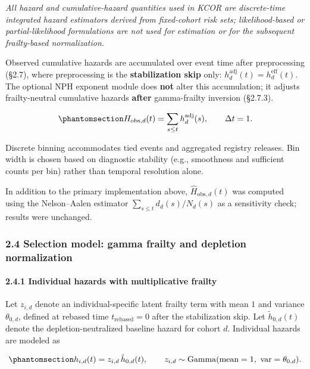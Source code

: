 \documentclass[
]{article}
\begin{document}
\emph{All hazard and cumulative-hazard quantities used in KCOR are discrete-time integrated hazard estimators derived from fixed-cohort risk sets; likelihood-based or partial-likelihood formulations are not used for estimation or for the subsequent frailty-based normalization.}

Observed cumulative hazards are accumulated over event time after preprocessing (§2.7), where preprocessing is the \textbf{stabilization skip} only: \(h_d^{\mathrm{adj}}(t)=h_d^{\mathrm{eff}}(t)\). The optional NPH exponent module does \textbf{not} alter this accumulation; it adjusts frailty-neutral cumulative hazards \textbf{after} gamma-frailty inversion (§2.7.3).

\begin{equation}\protect\phantomsection\label{eq:cumhazard-observed}{H_{\mathrm{obs},d}(t) = \sum_{s \le t} h_d^{\mathrm{adj}}(s),
\qquad \Delta t = 1.}\end{equation}

Discrete binning accommodates tied events and aggregated registry releases. Bin width is chosen based on diagnostic stability (e.g., smoothness and sufficient counts per bin) rather than temporal resolution alone.

In addition to the primary implementation above, \(\hat H_{\mathrm{obs},d}(t)\) was computed using the Nelson--Aalen estimator \(\sum_{s \le t} d_d(s)/N_d(s)\) as a sensitivity check; results were unchanged.

\subsubsection{2.4 Selection model: gamma frailty and depletion normalization}\label{selection-model-gamma-frailty-and-depletion-normalization}

\paragraph{2.4.1 Individual hazards with multiplicative frailty}\label{individual-hazards-with-multiplicative-frailty}

Let \(z_{i,d}\) denote an individual-specific latent frailty term with mean \(1\) and variance \(\theta_{0,d}\), defined at rebased time \(t_{\mathrm{rebased}}=0\) after the stabilization skip. Let \(\tilde h_{0,d}(t)\) denote the depletion-neutralized baseline hazard for cohort \(d\). Individual hazards are modeled as

\begin{equation}\protect\phantomsection\label{eq:individual-hazard-frailty}{h_{i,d}(t) = z_{i,d}\,\tilde h_{0,d}(t),
\qquad
z_{i,d} \sim \mathrm{Gamma}(\mathrm{mean}=1,\ \mathrm{var}=\theta_{0,d}).}\end{equation}
\end{document}
